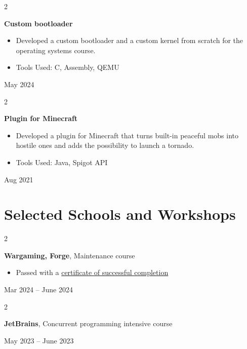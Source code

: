 \documentclass[10pt, letterpaper]{article}
\newenvironment{highlights}{
    \begin{itemize}[
        topsep=0.10 cm,
        parsep=0.10 cm,
        partopsep=0pt,
        itemsep=0pt,
        leftmargin=0.4 cm + 10pt
    ]
}{
    \end{itemize}
} %
\newenvironment{twocolentry}[2][]{
    \onecolentry
    \def\secondColumn{#2}
    \setcolumnwidth{\fill, 4.5 cm}
    \begin{paracol}{2}
}{
    \switchcolumn \raggedleft \secondColumn
    \end{paracol}
    \endonecolentry
} %
\begin{document}
        \vspace{0.2 cm}

        \begin{twocolentry}{
            May 2024
        }
            \textbf{Custom bootloader}
            \begin{highlights}
                \item Developed a custom bootloader and a custom kernel from scratch for the operating systems course.
                \item Tools Used: C, Assembly, QEMU
            \end{highlights}
        \end{twocolentry}


        \vspace{0.2 cm}

        \begin{twocolentry}{
            Aug 2021
        }
            \textbf{Plugin for Minecraft}
            \begin{highlights}
                \item Developed a plugin for Minecraft that turns built-in peaceful mobs into hostile ones and adds the possibility to launch a tornado.
                \item Tools Used: Java, Spigot API
            \end{highlights}
        \end{twocolentry}



    
    \section{Selected Schools and Workshops}



        
        \begin{twocolentry}{
            Mar 2024 – June 2024
        }
            \textbf{Wargaming, Forge}, Maintenance course
            \begin{highlights}
                \item Passed with a \href{https://drive.google.com/file/d/1p-x37Ugsu4JONwdZj5UdreDqEqGhXrW3/view?usp=sharing}{certificate of successful completion}
            \end{highlights}
        \end{twocolentry}


        \vspace{0.2 cm}

        \begin{twocolentry}{
            May 2023 – June 2023
        }
            \textbf{JetBrains}, Concurrent programming intensive course
        \end{twocolentry}
\end{document}
